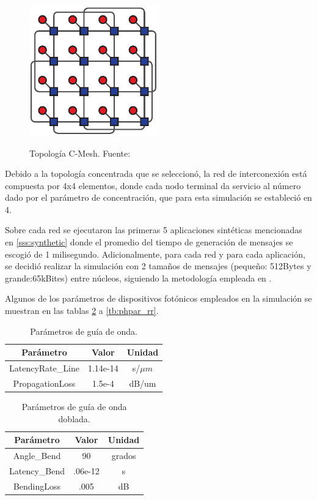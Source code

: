 \begin{figure}[h!]
\caption{Topología C-Mesh. Fuente: \cite{Manual}}
\centering
\includegraphics[width=0.5\textwidth,natwidth=333,natheight=336]{figs/cmesh.png}
\label{fig:cmesh}
\end{figure} 

Debido a la topología concentrada que se seleccionó, la red de interconexión 
está compuesta por 4x4 elementos, donde cada nodo terminal da servicio al 
número dado por el parámetro de concentración, que para esta simulación se estableció
en 4.

Sobre cada red se ejecutaron las primeras 5 aplicaciones sintéticas
mencionadas en \ref{sss:synthetic} donde el promedio del tiempo
de generación de mensajes se escogió de 1 milisegundo. Adicionalmente,
para cada red y para cada aplicación, se decidió realizar la simulación
con 2 tamaños de mensajes (pequeño: 512Bytes y grande:65kBites) entre núcleos,
siguiendo la metodología empleada en \cite{hendry2009analysis}.

Algunos de los parámetros de dispositivos fotónicos
empleados en la simulación se muestran en las tablas 
\ref{tb:phpar_wgb} a \ref{tb:phpar_rr}.

\begin{table}[H]
\centering
\begin{tabular}{|c|c|c|}
\hline
Parámetro & Valor & Unidad \\ 
\hline
LatencyRate\_Line & 1.14e-14 &s/$\mu m$ \\
PropagationLoss & 1.5e-4 & dB/um \\
\hline
\end{tabular}
\caption{Parámetros de guía de onda. \cite{xia2006ultracompact} \cite{gnan2008fabrication}}
\label{tb:phpar_wg}
\end{table} 

\begin{table}[H]
\centering
\begin{tabular}{|c|c|c|}
\hline
Parámetro & Valor & Unidad \\ 
\hline
Angle\_Bend & 90 & grados \\
Latency\_Bend & .06e-12 &s \\
BendingLoss & .005 & dB \\
\hline
\end{tabular}
\caption{Parámetros de guía de onda doblada. \cite{xia2006ultracompact}}
\label{tb:phpar_wgb}
\end{table} 

